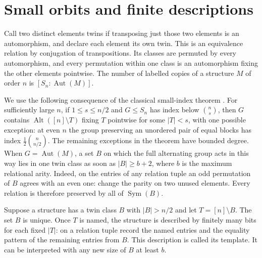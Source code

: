 \documentclass[11pt]{article}
\newcommand{\Aut}{\operatorname{Aut}}
\newcommand{\Alt}{\operatorname{Alt}}
\newcommand{\Sym}{\operatorname{Sym}}
\begin{document}
\section{Small orbits and finite descriptions}
Call two distinct elements twins if transposing just those two elements is an automorphism, and declare each element its own twin. This is an equivalence relation by conjugation of transpositions. Its classes are permuted by every automorphism, and every permutation within one class is an automorphism fixing the other elements pointwise. The number of labelled copies of a structure $M$ of order $n$ is $[S_n:\Aut(M)]$.

We use the following consequence of the classical small-index theorem \cite[Theorem 5.2B]{dm}. For sufficiently large $n$, if $1\le s\le n/2$ and $G\le S_n$ has index below $\binom ns$, then $G$ contains $\Alt([n]\setminus T)$ fixing $T$ pointwise for some $|T|<s$, with one possible exception: at even $n$ the group preserving an unordered pair of equal blocks has index $\frac12\binom n{n/2}$. The remaining exceptions in the theorem have bounded degree. When $G=\Aut(M)$, a set $B$ on which the full alternating group acts in this way lies in one twin class as soon as $|B|\ge b+2$, where $b$ is the maximum relational arity. Indeed, on the entries of any relation tuple an odd permutation of $B$ agrees with an even one: change the parity on two unused elements. Every relation is therefore preserved by all of $\Sym(B)$.

Suppose a structure has a twin class $B$ with $|B|>n/2$ and let $T=[n]\setminus B$. The set $B$ is unique. Once $T$ is named, the structure is described by finitely many bits for each fixed $|T|$: on a relation tuple record the named entries and the equality pattern of the remaining entries from $B$. This description is called its template. It can be interpreted with any new size of $B$ at least $b$.
\end{document}
